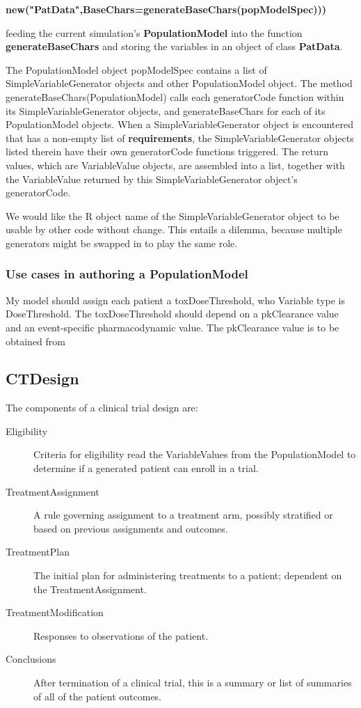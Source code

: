 \documentclass[12pt]{amsart}
\def\code<#1>{\textbf{#1}}
\begin{document}
             \code<new("PatData",BaseChars=generateBaseChars(popModelSpec)))  >

feeding the current simulation's \code<PopulationModel>
into the function \code<generateBaseChars>
and storing the variables in an object of class \code<PatData>.

The PopulationModel object popModelSpec contains a list
of SimpleVariableGenerator objects and other PopulationModel object.
The method generateBaseChars(PopulationModel)  calls each 
generatorCode function within its SimpleVariableGenerator objects,
and generateBaseChars for each of its PopulationModel objects.
When a SimpleVariableGenerator object
is encountered that has a non-empty list of \code<requirements>,
the SimpleVariableGenerator objects listed therein have their own
generatorCode functions triggered. The return values, which are
VariableValue objects, are assembled into a list, together with the
VariableValue returned by this SimpleVariableGenerator object's
generatorCode.

We would like the R object name of the SimpleVariableGenerator object
to be usable by other code without change.
This entails a dilemma, because multiple generators might be swapped in
to play the same role.

\subsubsection{Use cases in authoring a PopulationModel}

My model should assign each patient a toxDoseThreshold, who Variable type is DoseThreshold.
The toxDoseThreshold should depend on a pkClearance value and an event-specific 
pharmacodynamic value.
The pkClearance value is to be obtained from 



\subsection{ CTDesign}

The components of a clinical trial design are:
\begin{description}
\item[ Eligibility] Criteria for eligibility read the VariableValues from the PopulationModel to determine if a generated patient can enroll in a trial.
\item[ TreatmentAssignment] A rule governing assignment to a treatment arm, possibly stratified or based on previous assignments and outcomes.
\item[ TreatmentPlan]  The initial plan for administering treatments to a patient; dependent on the TreatmentAssignment.
\item[ TreatmentModification] Responses to observations of the patient.
\item[ Conclusions] After termination of a clinical trial, this is a summary or list of summaries of all of the patient outcomes. 
\end{description}
\end{document}
